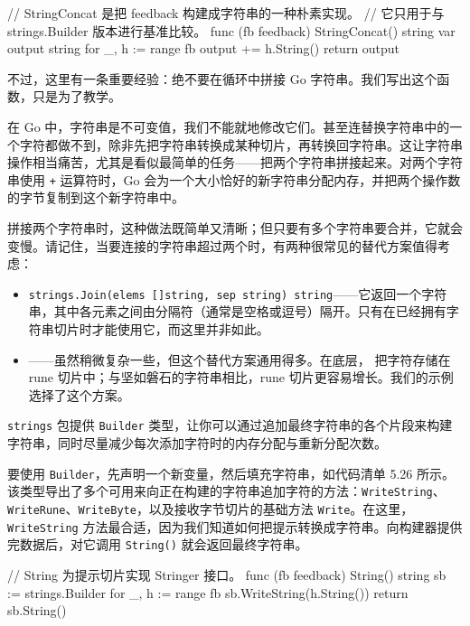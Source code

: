 \begin{gocode}[title={代码清单 5.25 构建字符串的朴素实现}]
// StringConcat 是把 feedback 构建成字符串的一种朴素实现。
// 它只用于与 strings.Builder 版本进行基准比较。
func (fb feedback) StringConcat() string {
    var output string
    for _, h := range fb {
        output += h.String()
    }
    return output
}
\end{gocode}

不过，这里有一条重要经验：绝不要在循环中拼接 Go 字符串。我们写出这个函数，只是为了教学。

在 Go 中，字符串是不可变值，我们不能就地修改它们。甚至连替换字符串中的一个字符都做不到，除非先把字符串转换成某种切片，再转换回字符串。这让字符串操作相当痛苦，尤其是看似最简单的任务——把两个字符串拼接起来。对两个字符串使用 \texttt{+} 运算符时，Go 会为一个大小恰好的新字符串分配内存，并把两个操作数的字节复制到这个新字符串中。

拼接两个字符串时，这种做法既简单又清晰；但只要有多个字符串要合并，它就会变慢。请记住，当要连接的字符串超过两个时，有两种很常见的替代方案值得考虑：

\begin{itemize}
  \item \texttt{strings.Join(elems []string, sep string) string}——它返回一个字符串，其中各元素之间由分隔符（通常是空格或逗号）隔开。只有在已经拥有字符串切片时才能使用它，而这里并非如此。
  \item {}——虽然稍微复杂一些，但这个替代方案通用得多。在底层， 把字符存储在 rune 切片中；与坚如磐石的字符串相比，rune 切片更容易增长。我们的示例选择了这个方案。
\end{itemize}

\texttt{strings} 包提供 \texttt{Builder} 类型，让你可以通过追加最终字符串的各个片段来构建字符串，同时尽量减少每次添加字符时的内存分配与重新分配次数。

要使用 \texttt{Builder}，先声明一个新变量，然后填充字符串，如代码清单 5.26 所示。该类型导出了多个可用来向正在构建的字符串追加字符的方法：\texttt{WriteString}、\texttt{WriteRune}、\texttt{WriteByte}，以及接收字节切片的基础方法 \texttt{Write}。在这里，\texttt{WriteString} 方法最合适，因为我们知道如何把提示转换成字符串。向构建器提供完数据后，对它调用 \texttt{String()} 就会返回最终字符串。

\begin{gocode}[title={代码清单 5.26 \texttt{hint.go}：\texttt{feedback} 类型上的 \texttt{String()}}]
// String 为提示切片实现 Stringer 接口。
func (fb feedback) String() string {
    sb := strings.Builder{}
    for _, h := range fb {
        sb.WriteString(h.String())
    }
    return sb.String()
}
\end{gocode}

